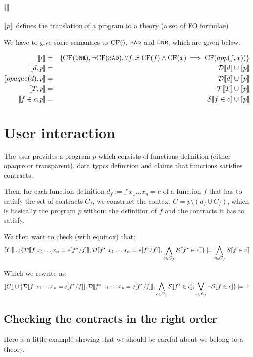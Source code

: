 \documentclass{article}
\begin{document}
\subsection{$\llbracket  \rrbracket$}
$\llbracket p \rrbracket$ defines the translation of a program to a theory (a set of FO formulae)

We have to give some semantics to $\mbox{CF}()$, $\texttt{BAD}$ and $\texttt{UNR}$, which are given below.

\begin{eqnarray}
\llbracket \epsilon \rrbracket &=& \{ \mbox{CF}(\texttt{UNR}), \lnot \mbox{CF}(\texttt{BAD}), \forall f,x~\mbox{CF}(f) \land \mbox{CF}(x) \implies \mbox{CF}(app(f,x)) \}\\
\llbracket d,p \rrbracket &=& \mathcal{D} \llbracket d \rrbracket \cup \llbracket p \rrbracket\\
\llbracket opaque(d),p \rrbracket &=& \mathcal{D} \llbracket d \rrbracket \cup \llbracket p \rrbracket\\
\llbracket T,p \rrbracket &=& \mathcal{T} \llbracket T \rrbracket \cup \llbracket p \rrbracket\\
\llbracket f \in c,p \rrbracket &=& \mathcal{S} \llbracket f \in c \rrbracket \cup \llbracket p \rrbracket\\
\end{eqnarray}

\section{User interaction}

The user provides a program $p$ which consists of functions definition (either opaque or transparent), data types definition and claims that functions satisfies contracts.

Then, for each function definition $d_f := f~x_1 \dots x_n = e$ of a function $f$ that has to satisfy the set of contracts $C_f$, we construct the context $C = p \setminus ( d_f \cup C_f )$, which is basically the program $p$ without the definition of $f$ and the contracts it has to satisfy. 

We then want to check (with equinox) that:
 $$\llbracket C \rrbracket \cup \{ \mathcal{D} \llbracket f~x_1 \dots x_n = e[f^\star/f] \rrbracket, \mathcal{D} \llbracket f^\star~x_1 \dots x_n = e[f^\star/f] \rrbracket, \bigwedge_{c \in C_f} \mathcal{S} \llbracket f^\star \in c \rrbracket \} \models \bigwedge_{c \in C_f} \mathcal{S} \llbracket f \in c \rrbracket$$

Which we rewrite as:
 $$\llbracket C \rrbracket \cup \{ \mathcal{D} \llbracket f~x_1 \dots x_n = e[f^\star/f] \rrbracket, \mathcal{D} \llbracket f^\star~x_1 \dots x_n = e[f^\star/f] \rrbracket, \bigwedge_{c \in C_f} \mathcal{S} \llbracket f^\star \in c \rrbracket,  \bigvee_{c \in C_f} \lnot \mathcal{S} \llbracket f \in c \rrbracket \} \models \bot$$

\subsection{Checking the contracts in the right order}
Here is a little example showing that we should be careful about we
belong to a theory.
\end{document}
